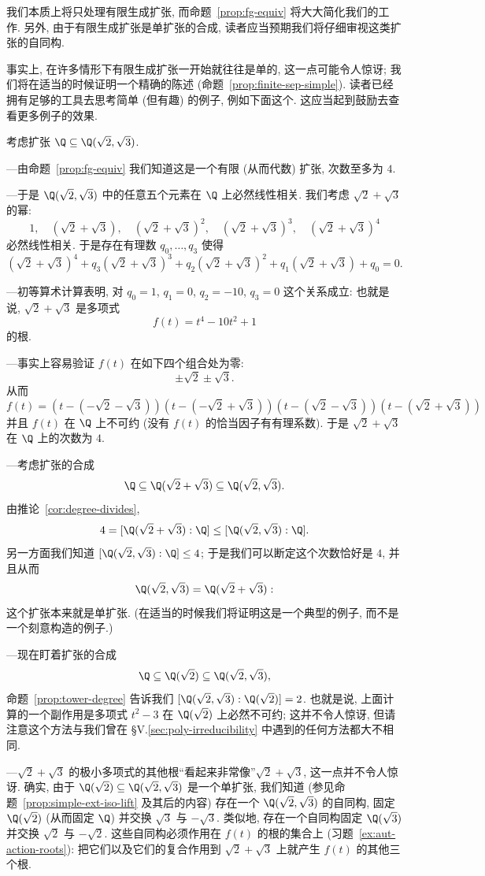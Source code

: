 我们本质上将只处理有限生成扩张, 而命题~\ref{prop:fg-equiv} 将大大简化我们的工作. 另外, 由于有限生成扩张是单扩张的合成, 读者应当预期我们将仔细审视这类扩张的自同构.

事实上, 在许多情形下有限生成扩张一开始就往往是单的, 这一点可能令人惊讶; 我们将在适当的时候证明一个精确的陈述 (命题~\ref{prop:finite-sep-simple}). 读者已经拥有足够的工具去思考简单 (但有趣) 的例子, 例如下面这个. 这应当起到鼓励去查看更多例子的效果.

\begin{example}\label{ex:sqrt2-sqrt3}
考虑扩张 $\Q\subseteq\Q(\sqrt{2},\sqrt{3})$.

—由命题~\ref{prop:fg-equiv} 我们知道这是一个有限 (从而代数) 扩张, 次数至多为 $4$.

—于是 $\Q(\sqrt{2},\sqrt{3})$ 中的任意五个元素在 $\Q$ 上必然线性相关. 我们考虑 $\sqrt{2}+\sqrt{3}$ 的幂:
\[
1,\quad (\sqrt{2}+\sqrt{3}),\quad (\sqrt{2}+\sqrt{3})^2,\quad (\sqrt{2}+\sqrt{3})^3,\quad (\sqrt{2}+\sqrt{3})^4
\]
必然线性相关. 于是存在有理数 $q_0,\ldots,q_3$ 使得
\[
(\sqrt{2}+\sqrt{3})^4+q_3(\sqrt{2}+\sqrt{3})^3+q_2(\sqrt{2}+\sqrt{3})^2+q_1(\sqrt{2}+\sqrt{3})+q_0=0.
\]

—初等算术计算表明, 对 $q_0=1$, $q_1=0$, $q_2=-10$, $q_3=0$ 这个关系成立: 也就是说, $\sqrt{2}+\sqrt{3}$ 是多项式
\[
f(t)=t^4-10t^2+1
\]
的根.

—事实上容易验证 $f(t)$ 在如下四个组合处为零:
\[
\pm\sqrt{2}\pm\sqrt{3}.
\]
从而
\[
f(t)=(t-(-\sqrt{2}-\sqrt{3}))(t-(-\sqrt{2}+\sqrt{3}))(t-(\sqrt{2}-\sqrt{3}))(t-(\sqrt{2}+\sqrt{3}))
\]
并且 $f(t)$ 在 $\Q$ 上不可约 (没有 $f(t)$ 的恰当因子有有理系数). 于是 $\sqrt{2}+\sqrt{3}$ 在 $\Q$ 上的次数为 $4$.

—考虑扩张的合成
\[
\Q\subseteq\Q(\sqrt{2}+\sqrt{3})\subseteq\Q(\sqrt{2},\sqrt{3}).
\]
由推论~\ref{cor:degree-divides},
\[
4=[\Q(\sqrt{2}+\sqrt{3}):\Q]\leq [\Q(\sqrt{2},\sqrt{3}):\Q].
\]
另一方面我们知道 $[\Q(\sqrt{2},\sqrt{3}):\Q]\leq 4$; 于是我们可以断定这个次数恰好是 $4$, 并且从而
\[
\Q(\sqrt{2},\sqrt{3})=\Q(\sqrt{2}+\sqrt{3}):
\]
这个扩张本来就是单扩张. (在适当的时候我们将证明这是一个典型的例子, 而不是一个刻意构造的例子.)

—现在盯着扩张的合成
\[
\Q\subseteq\Q(\sqrt{2})\subseteq\Q(\sqrt{2},\sqrt{3}),
\]
命题~\ref{prop:tower-degree} 告诉我们 $[\Q(\sqrt{2},\sqrt{3}):\Q(\sqrt{2})]=2$. 也就是说, 上面计算的一个副作用是多项式 $t^2-3$ 在 $\Q(\sqrt{2})$ 上必然不可约; 这并不令人惊讶, 但请注意这个方法与我们曾在 §V.\ref{sec:poly-irreducibility} 中遇到的任何方法都大不相同.

—$\sqrt{2}+\sqrt{3}$ 的极小多项式的其他根``看起来非常像''$\sqrt{2}+\sqrt{3}$, 这一点并不令人惊讶. 确实, 由于 $\Q(\sqrt{2})\subseteq\Q(\sqrt{2},\sqrt{3})$ 是一个单扩张, 我们知道 (参见命题~\ref{prop:simple-ext-iso-lift} 及其后的内容) 存在一个 $\Q(\sqrt{2},\sqrt{3})$ 的自同构, 固定 $\Q(\sqrt{2})$ (从而固定 $\Q$) 并交换 $\sqrt{3}$ 与 $-\sqrt{3}$. 类似地, 存在一个自同构固定 $\Q(\sqrt{3})$ 并交换 $\sqrt{2}$ 与 $-\sqrt{2}$. 这些自同构必须作用在 $f(t)$ 的根的集合上 (习题~\ref{ex:aut-action-roots}): 把它们以及它们的复合作用到 $\sqrt{2}+\sqrt{3}$ 上就产生 $f(t)$ 的其他三个根.


\end{example}
